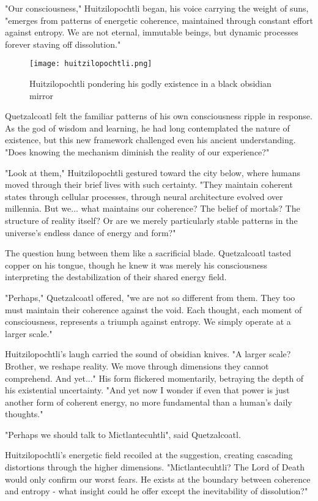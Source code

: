 \begin{refsection}
"Our consciousness," Huitzilopochtli began, his voice carrying the weight of suns, "emerges from patterns of energetic coherence, maintained through constant effort against entropy. We are not eternal, immutable beings, but dynamic processes forever staving off dissolution."

\begin{figure}[h]
    \centering
    \texttt{[image: huitzilopochtli.png]}

    \caption{Huitzilopochtli pondering his godly existence in a black obsidian mirror}
\end{figure}

Quetzalcoatl felt the familiar patterns of his own consciousness ripple in response. As the god of wisdom and learning, he had long contemplated the nature of existence, but this new framework challenged even his ancient understanding. "Does knowing the mechanism diminish the reality of our experience?"

"Look at them," Huitzilopochtli gestured toward the city below, where humans moved through their brief lives with such certainty. "They maintain coherent states through cellular processes, through neural architecture evolved over millennia. But we... what maintains our coherence? The belief of mortals? The structure of reality itself? Or are we merely particularly stable patterns in the universe's endless dance of energy and form?"

The question hung between them like a sacrificial blade. Quetzalcoatl tasted copper on his tongue, though he knew it was merely his consciousness interpreting the destabilization of their shared energy field.

"Perhaps," Quetzalcoatl offered, "we are not so different from them. They too must maintain their coherence against the void. Each thought, each moment of consciousness, represents a triumph against entropy. We simply operate at a larger scale."

Huitzilopochtli's laugh carried the sound of obsidian knives. "A larger scale? Brother, we reshape reality. We move through dimensions they cannot comprehend. And yet..." His form flickered momentarily, betraying the depth of his existential uncertainty. "And yet now I wonder if even that power is just another form of coherent energy, no more fundamental than a human's daily thoughts."

"Perhaps we should talk to Mictlantecuhtli", said Quetzalcoatl.

Huitzilopochtli's energetic field recoiled at the suggestion, creating cascading distortions through the higher dimensions. "Mictlantecuhtli? The Lord of Death would only confirm our worst fears. He exists at the boundary between coherence and entropy - what insight could he offer except the inevitability of dissolution?"


\end{refsection}
